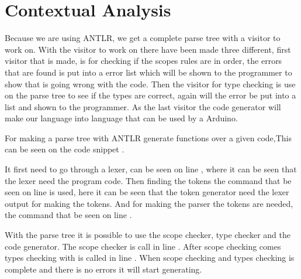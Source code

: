 \section{Contextual Analysis}
Because we are using ANTLR, we get a complete parse tree with a visitor to work on. With the visitor to work on there have been made three different, first visitor that is made, is for checking if the scopes rules are in order, the errors that are found is put into a error list which will be shown to the programmer to show that is going wrong with the code. Then the visitor for type checking is use on the parse tree to see if the types are correct, again will the error be put into a list and shown to the programmer. As the last visitor the code generator will make our language into language that can be used by a Arduino.

For making a parse tree with ANTLR generate functions over a given code,This can be seen on the code snippet .

It first need to go through a lexer, can be seen on line , where it can be seen that the lexer need the program code. Then finding the tokens the command that be seen on line  is used, here it can be seen that the token generator need the lexer output for making the tokens. And for making the parser the tokens are needed, the command that be seen on line .

With the parse tree it is possible to use the scope checker, type checker and the code generator. The scope checker is call in line . After scope checking comes types checking with is called in line . When scope checking and types checking is complete and there is no errors it will start generating.